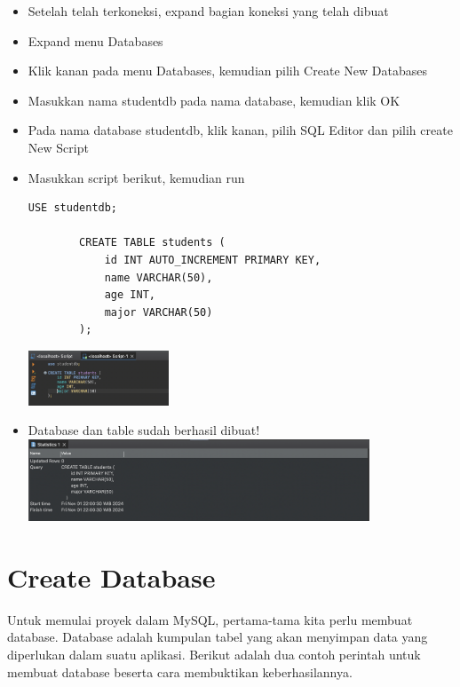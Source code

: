 \begin{itemize}
	\item Setelah telah terkoneksi, expand bagian koneksi yang telah dibuat 
	
	\item Expand menu Databases
	
	\item Klik kanan pada menu Databases, kemudian pilih Create New Databases
	
	\item Masukkan nama studentdb pada nama database, kemudian klik OK
	
	\item Pada nama database studentdb, klik kanan, pilih SQL Editor dan pilih create New Script
	
	\item Masukkan script berikut, kemudian run
	\begin{lstlisting}[style=JavaStyle]
		USE studentdb;
		
		CREATE TABLE students (
			id INT AUTO_INCREMENT PRIMARY KEY,
			name VARCHAR(50),
			age INT,
			major VARCHAR(50)
		);
	\end{lstlisting}
	\includegraphics[width=0.33\textwidth]{assets/pertemuan12/dbeaver-script-create-table.png}
	
	\item Database dan table sudah berhasil dibuat!\\
	\includegraphics[width=0.8\textwidth]{assets/pertemuan12/dbeaver-table-success-script.png}
	
\end{itemize}


\section{Create Database}

Untuk memulai proyek dalam MySQL, pertama-tama kita perlu membuat database. Database adalah kumpulan tabel yang akan menyimpan data yang diperlukan dalam suatu aplikasi. Berikut adalah dua contoh perintah untuk membuat database beserta cara membuktikan keberhasilannya.

